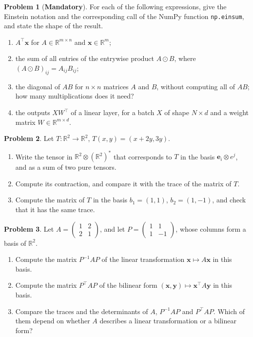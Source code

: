 \documentclass[11pt]{article}
\theoremstyle{definition}
\newtheorem{problem}{Problem}[section]
\newcommand{\mandatory}{\textcolor{red!70!black}{\textbf{Mandatory}}}
\begin{document}
\begin{problem}[\mandatory]\label{pr:einsum-practice}
    For each of the following expressions, give the Einstein notation and the corresponding call of the NumPy function \texttt{np.einsum}, and state the shape of the result.
    \begin{enumerate}[label=(\alph*)]
        \item $A^\top \mathbf{x}$ for $A \in \mathbb{R}^{m \times n}$ and $\mathbf{x} \in \mathbb{R}^m$;
        \item the sum of all entries of the entrywise product $A \odot B$, where $(A \odot B)_{ij} = A_{ij}B_{ij}$;
        \item the diagonal of $AB$ for $n \times n$ matrices $A$ and $B$, without computing all of $AB$; how many multiplications does it need?
        \item the outputs $XW^\top$ of a linear layer, for a batch $X$ of shape $N \times d$ and a weight matrix $W \in \mathbb{R}^{m \times d}$.
    \end{enumerate}
\end{problem}

\begin{problem}\label{pr:linear-map-tensor}
    Let $T: \mathbb{R}^2 \to \mathbb{R}^2$, $T(x, y) = (x + 2y, 3y)$.
    \begin{enumerate}[label=(\alph*)]
        \item Write the tensor in $\mathbb{R}^2 \otimes (\mathbb{R}^2)^*$ that corresponds to $T$ in the basis $\mathbf{e}_i \otimes e^j$, and as a sum of two pure tensors.
        \item Compute its contraction, and compare it with the trace of the matrix of $T$.
        \item Compute the matrix of $T$ in the basis $b_1 = (1, 1)$, $b_2 = (1, -1)$, and check that it has the same trace.
    \end{enumerate}
\end{problem}

\begin{problem}\label{pr:change-of-basis-practice}
    Let $A = \begin{pmatrix} 1 & 2 \\ 2 & 1 \end{pmatrix}$, and let $P = \begin{pmatrix} 1 & 1 \\ 1 & -1 \end{pmatrix}$, whose columns form a basis of $\mathbb{R}^2$.
    \begin{enumerate}[label=(\alph*)]
        \item Compute the matrix $P^{-1}AP$ of the linear transformation $\mathbf{x} \mapsto A\mathbf{x}$ in this basis.
        \item Compute the matrix $P^\top AP$ of the bilinear form $(\mathbf{x}, \mathbf{y}) \mapsto \mathbf{x}^\top A\mathbf{y}$ in this basis.
        \item Compare the traces and the determinants of $A$, $P^{-1}AP$ and $P^\top AP$. Which of them depend on whether $A$ describes a linear transformation or a bilinear form?
    \end{enumerate}
\end{problem}
\end{document}
